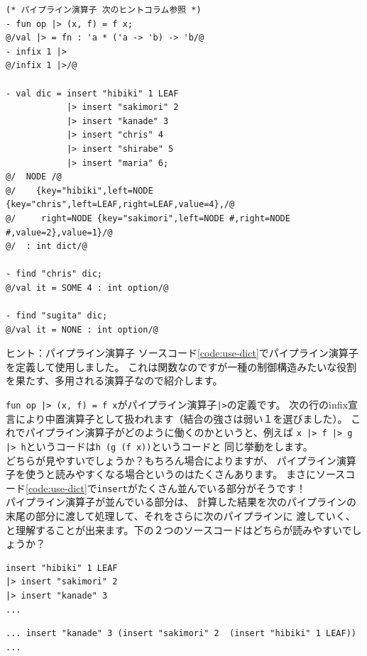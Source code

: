 \documentclass[11pt,a4paper]{article}
\begin{document}
\begin{lstlisting}[caption=dict型の利用,label=code:use-dict]
(* パイプライン演算子 次のヒントコラム参照 *)
- fun op |> (x, f) = f x;
@/val |> = fn : 'a * ('a -> 'b) -> 'b/@
- infix 1 |>
@/infix 1 |>/@

- val dic = insert "hibiki" 1 LEAF
            |> insert "sakimori" 2
            |> insert "kanade" 3
            |> insert "chris" 4
            |> insert "shirabe" 5
            |> insert "maria" 6;
@/  NODE /@
@/    {key="hibiki",left=NODE {key="chris",left=LEAF,right=LEAF,value=4},/@
@/     right=NODE {key="sakimori",left=NODE #,right=NODE #,value=2},value=1}/@
@/  : int dict/@

- find "chris" dic;
@/val it = SOME 4 : int option/@

- find "sugita" dic;
@/val it = NONE : int option/@
\end{lstlisting}

\begin{itembox}[l]{ヒント：パイプライン演算子}
ソースコード\ref{code:use-dict}でパイプライン演算子を定義して使用しました。
これは関数なのですが一種の制御構造みたいな役割を果たす、多用される演算子なので紹介します。

\lstinline{fun op |> (x, f) = f x}がパイプライン演算子\lstinline{|>}の定義です。
次の行のinfix宣言により中置演算子として扱われます（結合の強さは弱い１を選びました）。
これでパイプライン演算子がどのように働くのかというと、例えば
\lstinline{x |> f |> g |> h}というコードは\lstinline{h (g (f x))}というコードと
同じ挙動をします。\\
どちらが見やすいでしょうか？もちろん場合によりますが、
パイプライン演算子を使うと読みやすくなる場合というのはたくさんあります。
まさにソースコード\ref{code:use-dict}で\lstinline{insert}がたくさん並んでいる部分がそうです！\\
パイプライン演算子が並んでいる部分は、
計算した結果を次のパイプラインの末尾の部分に渡して処理して、それをさらに次のパイプラインに
渡していく、と理解することが出来ます。下の２つのソースコードはどちらが読みやすいでしょうか？

\begin{lstlisting}
insert "hibiki" 1 LEAF
|> insert "sakimori" 2
|> insert "kanade" 3
...
\end{lstlisting}

\begin{lstlisting}
... insert "kanade" 3 (insert "sakimori" 2  (insert "hibiki" 1 LEAF)) ...
\end{lstlisting}

\end{itembox}
\end{document}
